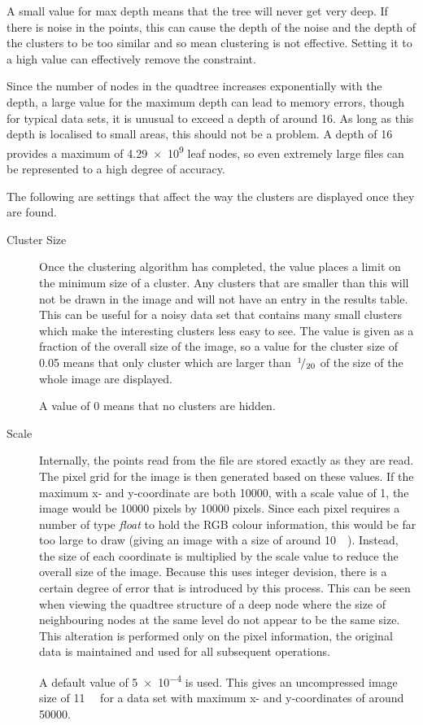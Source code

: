 \begin{description}
		A small value for max depth means that the tree will never get very
		deep. If there is noise in the points, this can cause the depth of the
		noise and the depth of the clusters to be too similar and so mean
		clustering is not effective. Setting it to a high value can effectively
		remove the constraint.

		Since the number of nodes in the quadtree increases exponentially with
		the depth, a large value for the maximum depth can lead to memory
		errors, though for typical data sets, it is unusual to exceed a depth
		of around 16. As long as this depth is localised to small areas, this
		should not be a problem. A depth of 16 provides a maximum of
		\num{4.29e9} leaf nodes, so even extremely large files can be
		represented to a high degree of accuracy.

\end{description}

The following are settings that affect the way the clusters are displayed once
they are found.

\begin{description}
	\item[Cluster Size] Once the clustering algorithm has completed, the value
		places a limit on the minimum size of a cluster. Any clusters that are
		smaller than this will not be drawn in the image and will not have an
		entry in the results table. This can be useful for a noisy data set
		that contains many small clusters which make the interesting clusters
		less easy to see. The value is given as a fraction of the overall size
		of the image, so a value for the cluster size of 0.05 means that only
		cluster which are larger than~${}^{1}\!/_{20}$ of the size of the whole
		image are displayed.

		A value of 0 means that no clusters are hidden.

	\item[Scale] Internally, the points read from the file are stored exactly
		as they are read. The pixel grid for the image is then generated based
		on these values. If the maximum x- and y-coordinate are both
		\num{10000}, with a scale value of 1, the image would be \num{10000}
		pixels by \num{10000} pixels. Since each pixel requires a number of
		type \emph{float} to hold the RGB colour information, this would be far
		too large to draw (giving an image with a size of around
		\SI{10}{\giga\byte}). Instead, the size of each coordinate is
		multiplied by the scale value to reduce the overall size of the image.
		Because this uses integer devision, there is a certain degree of error
		that is introduced by this process. This can be seen when viewing the
		quadtree structure of a deep node where the size of neighbouring nodes
		at the same level do not appear to be the same size. This alteration is
		performed only on the pixel information, the original data is
		maintained and used for all subsequent operations.

		A default value of \num{5e-4} is used. This gives an uncompressed image
		size of \SI{11}{\mega\byte} for a data set with maximum x- and
		y-coordinates of around \num{50000}.
\end{description}

